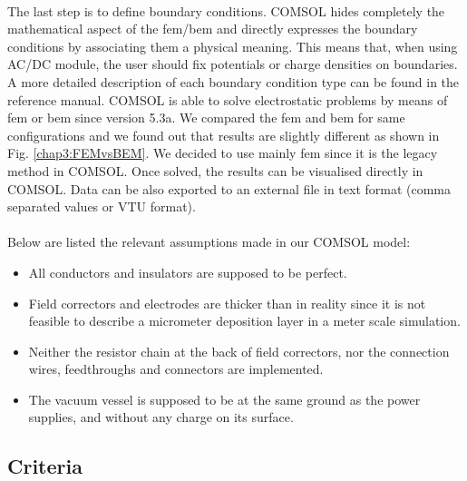 \begin{refsection}
  

  \paragraph{}
  The last step is to define boundary conditions. COMSOL hides completely the mathematical aspect of the \acrshort{fem}/\acrshort{bem} and directly expresses the boundary conditions by associating them a physical meaning. This means that, when using AC/DC module, the user should fix potentials or charge densities on boundaries. A more detailed description of each boundary condition type can be found in the reference manual. COMSOL is able to solve electrostatic problems by means of \acrshort{fem} or \acrshort{bem} since version 5.3a. We compared the \acrshort{fem} and \acrshort{bem} for same configurations and we found out that results are slightly different as shown in Fig. \ref{chap3:FEMvsBEM}. We decided to use mainly \acrshort{fem} since it is the legacy method in COMSOL.
  Once solved, the results can be visualised directly in COMSOL. Data can be also exported to an external file in text format (comma separated values or VTU format).

  

  \paragraph{}
  Below are listed the relevant assumptions made in our COMSOL model:
  \begin{itemize}
    \item All conductors and insulators are supposed to be perfect.
    \item Field correctors and electrodes are thicker than in reality since it is not feasible to describe a micrometer deposition layer in a meter scale simulation.
    \item Neither the resistor chain at the back of field correctors, nor the connection wires, feedthroughs and connectors are implemented.
    \item The vacuum vessel is supposed to be at the same ground as the power supplies, and without any charge on its surface.
  \end{itemize}

  \subsection{Criteria}


\end{refsection}
